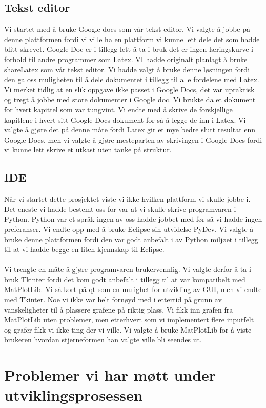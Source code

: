 \subsection{Tekst editor}
Vi startet med å bruke Google docs som vår tekst editor. Vi valgte å jobbe på denne plattformen fordi vi ville ha en plattform vi kunne lett dele det som hadde blitt skrevet. Google Doc er i tillegg lett å ta i bruk det er ingen læringskurve i forhold til andre programmer som Latex. VI hadde originalt planlagt å bruke shareLatex som vår tekst editor. Vi hadde valgt å bruke denne løsningen fordi den ga oss muligheten til å dele dokumentet i tillegg til alle fordelene med Latex. Vi merket tidlig at en slik oppgave ikke passet i Google Docs, det var upraktisk og tregt å jobbe med store dokumenter i Google doc. Vi brukte da et dokument for hvert kapittel som var tungvint. Vi endte med å skrive de forskjellige kapitlene i hvert sitt Google Docs dokument for så å legge de inn i Latex. Vi valgte å gjøre det på denne måte fordi Latex gir et mye bedre slutt resultat enn Google Docs, men vi valgte å gjøre mesteparten av skrivingen i Google Docs fordi vi kunne lett skrive et utkast uten tanke på struktur. 

\subsection{IDE}
Når vi startet dette prosjektet viste vi ikke hvilken plattform vi skulle jobbe i. Det eneste vi hadde bestemt oss for var at vi skulle skrive programvaren i Python. Python var et språk ingen av oss hadde jobbet med før så vi hadde ingen preferanser. Vi endte opp med å bruke Eclipse sin utvidelse PyDev. Vi valgte å bruke denne plattformen fordi den var godt anbefalt i av Python miljøet i tillegg til at vi hadde begge en liten kjennskap til Eclipse. \\ \\
Vi trengte en måte å gjøre programvaren brukervennlig. Vi valgte derfor å ta i bruk Tkinter fordi det kom godt anbefalt i tillegg til at var kompatibelt med MatPlotLib. Vi så kort på qt som en mulighet for utvikling av GUI, men vi endte med Tkinter. Noe vi ikke var helt fornøyd med i ettertid på grunn av vanskeligheter til å plassere grafene på riktig plass. Vi fikk inn grafen fra MatPlotLib uten problemer, men etterhvert som vi implementert flere inputfelt og grafer  fikk vi ikke ting der vi ville. Vi valgte å bruke MatPlotLib for å viste brukeren hvordan stjerneformen han valgte ville bli seendes ut. 
\section{Problemer vi har møtt under utviklingsprosessen}


